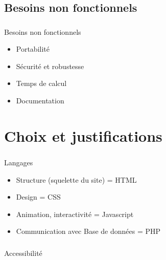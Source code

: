 \documentclass[11pt]{beamer}
\begin{document}
\subsection{Besoins non fonctionnels}

\begin{frame}
	\frametitle{\subsecname}
	\begin{block}{Besoins non fonctionnels}
		\begin{itemize}
		\item Portabilité
		\item Sécurité et robustesse
		\item Temps de calcul
		\item Documentation
		\end{itemize}
	\end{block}
\end{frame}

\section{Choix et justifications	}	

\begin{frame}
	\frametitle{\secname}
	\begin{block}{Langages}
		\begin{itemize}
		\item Structure (squelette du site) = HTML
\item Design = CSS
\item Animation, interactivité = Javascript
\item Communication avec Base de données = PHP

		\end{itemize}
	\end{block}
\end{frame}

\begin{frame}
	\frametitle{\secname}
	\begin{block}{Accessibilité}
	\end{block}
\end{frame}
\end{document}
